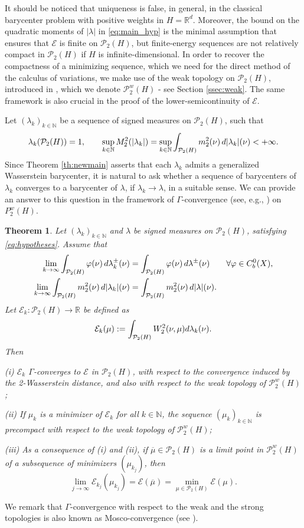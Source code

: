 \documentclass[12pt,a4paper]{article}
\newcommand{\N}{\mathbb{N}}
\newcommand{\R}{\mathbb{R}}
\renewcommand{\P}{\mathcal{P}}
\renewcommand{\d}{{\rm d}}
\newcommand{\X}{\mathcal{P}_2(H)}
\theoremstyle{plain}
\newtheorem{theorem}{Theorem}[section]
\theoremstyle{definition}
\begin{document}
It should be noticed that uniqueness is false, in general, in the classical barycenter problem with positive weights in $H=\R^d$. Moreover, the bound on the quadratic moments of $|\lambda|$ in \eqref{eq:main_hyp} is the minimal assumption that ensures that $\mathcal{E}$ is finite on $\X$, but finite-energy sequences are not relatively compact in $\X$ if $H$ is infinite-dimensional. In order to recover the compactness of a minimizing sequence, which we need for the direct method of the calculus of variations, we make use of the weak topology on $\X$, introduced in \cite{naldi-savare}, which we denote $\P_2^w(H)$ - see Section \ref{ssec:weak}. The same framework is also crucial in the proof of the lower-semicontinuity of $\mathcal{E}$.


Let $(\lambda_k)_{k\in\N}$ be a sequence of signed measures on $\X$, such that 
\begin{equation}
\label{eq:hypotheses}
	\lambda_k(\X)=1,\qquad \sup_{k \in \N}M_2^2(|\lambda_k|)=\sup_{k \in \N} \int_{\X}m_2^2(\nu)\, \d|\lambda_k|(\nu)<+\infty.
\end{equation}
Since Theorem \ref{th:newmain} asserts that each $\lambda_k$ admits a generalized Wasserstein barycenter, it is natural to ask whether a sequence of barycenters of $\lambda_k$ converges to a barycenter of $\lambda$, if $\lambda_k \to \lambda$, in a suitable sense. We can provide an answer to this question in the framework of $\Gamma$-convergence (see, e.g., \cite{dalmaso}) on $P_2^w(H)$.
\begin{theorem}
\label{th:gamma}
Let $(\lambda_k)_{k \in \N}$ and $\lambda$ be signed measures on $\X$, satisfying \eqref{eq:hypotheses}. Assume that
\begin{align}
	\lim_{k\to \infty} \int_{\X}\varphi(\nu)\,\d\lambda^{\pm}_k(\nu) &= \int_{\X}\varphi(\nu)\,\d\lambda^{\pm}(\nu) \qquad \forall \varphi \in C^0_b(X),\label{hyp:wconv}\\
	\lim_{k\to \infty} \int_{\X}m_2^2(\nu)\,\d |\lambda_k|(\nu) &= \int_{\X}m_2^2(\nu)\,\d |\lambda|(\nu).\label{hyp:moment}
\end{align}
Let $\mathcal{E}_k:\X \to \R$ be defined as
\[
	\mathcal{E}_k(\mu):= \int_{\X} W_2^2(\nu,\mu)\d\lambda_k(\nu).
\]
Then

(i) $\mathcal{E}_k$ $\Gamma$-converges to $\mathcal{E}$ in $\X$, with respect to the convergence induced by the 2-Wasserstein distance, and also with respect to the weak topology of $\P_2^w(H)$;

(ii) If $\mu_k$  is a minimizer of $\mathcal{E}_k$ for all $k\in \N$, the sequence $(\mu_k)_{k\in \N}$ is precompact with respect to the weak topology of $\P_2^w(H)$;

(iii) As a consequence of (i) and (ii),  if $\overline{\mu} \in \X$ is a limit point in $\P_2^w(H)$ of a subsequence of minimizers $(\mu_{k_j})$, then
	\[
		\lim_{j \to \infty} \mathcal{E}_{k_j}(\mu_{k_j}) = \mathcal{E}(\overline{\mu})=\min_{\mu \in \X}\mathcal{E}(\mu).
	\] 
\end{theorem}
We remark that $\Gamma$-convergence with respect to the weak and the strong topologies is also known as Mosco-convergence (see \cite{mosco}). 
\end{document}
